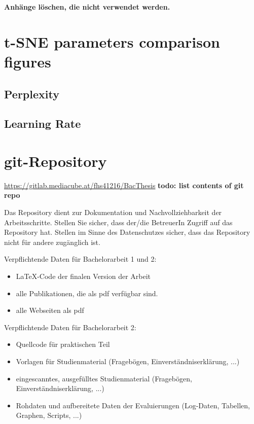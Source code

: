 \begin{appendices}
\textbf{\color{red} Anhänge löschen, die nicht verwendet werden.}

\section{t-SNE parameters comparison figures}
\label{appendix:tSNEParameters}
\subsection{Perplexity}
\label{appendix:tSNEParametersPerplexity}
% 

\subsection{Learning Rate}
\label{appendix:tSNEParametersLearningRate}
% 





\section{git-Repository}

\url{https://gitlab.mediacube.at/fhs41216/BacThesis}
\textbf{todo: list contents of git repo}

Das Repository dient zur Dokumentation und Nachvollziehbarkeit der Arbeitsschritte. Stellen Sie sicher, dass der/die BetreuerIn Zugriff auf das Repository hat. Stellen im Sinne des Datenschutzes sicher, dass das Repository nicht für andere zugänglich ist.

Verpflichtende Daten für Bachelorarbeit 1 und 2:

\begin{itemize}
	\item LaTeX-Code der finalen Version der Arbeit
	\item alle Publikationen, die als pdf verfügbar sind.
	\item alle Webseiten als pdf
\end{itemize}

Verpflichtende Daten für Bachelorarbeit 2:
\begin{itemize}
	\item Quellcode für praktischen Teil
	\item Vorlagen für Studienmaterial (Fragebögen, Einverständniserklärung, ...)	
	\item eingescanntes, ausgefülltes Studienmaterial (Fragebögen, Einverständniserklärung, ...)
	\item Rohdaten und aufbereitete Daten der Evaluierungen (Log-Daten, Tabellen, Graphen, Scripts, ...)	
\end{itemize}


\end{appendices}
